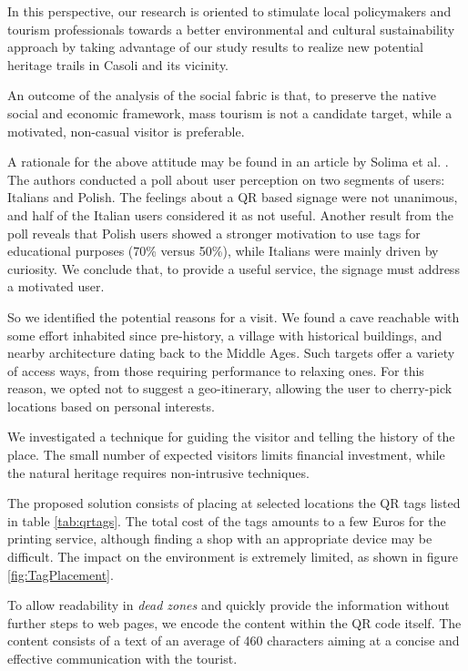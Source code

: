 \documentclass[sustainability,article,submit,pdftex,moreauthors]{Definitions/mdpi}
\begin{document}
In this perspective, our research is oriented to stimulate local policymakers and tourism professionals towards a better environmental and cultural sustainability approach by taking advantage of our study results to realize new potential heritage trails in Casoli and its vicinity.

An outcome of the analysis of the social fabric is that, to preserve the native social and economic framework, mass tourism is not a candidate target, while a motivated, non-casual visitor is preferable.

A rationale for the above attitude may be found in an article by Solima et al. \cite{sol18a}. The authors conducted a poll about user perception on two segments of users: Italians and Polish. The feelings about a QR based signage were not unanimous, and half of the Italian users considered it as not useful. Another result from the poll reveals that Polish users showed a stronger motivation to use tags for educational purposes (70\% versus 50\%), while Italians were mainly driven by curiosity. We conclude that, to provide a useful service, the signage must address a motivated user.

So we identified the potential reasons for a visit. We found a cave reachable with some effort inhabited since pre-history, a village with historical buildings, and nearby architecture dating back to the Middle Ages. Such targets offer a variety of access ways, from those requiring performance to relaxing ones. For this reason, we opted not to suggest a geo-itinerary, allowing the user to cherry-pick locations based on personal interests.

We investigated a technique for guiding the visitor and telling the history of the place. The small number of expected visitors limits financial investment, while the natural heritage requires non-intrusive techniques.

The proposed solution consists of placing at selected locations the QR tags listed in table \ref{tab:qrtags}. The total cost of the tags amounts to a few Euros for the printing service, although finding a shop with an appropriate device may be difficult. The impact on the environment is extremely limited, as shown in figure \ref{fig:TagPlacement}.

To allow readability in {\em dead zones} and quickly provide the information without further steps to web pages, we encode the content within the QR code itself. The content consists of a text of an average of 460 characters aiming at a concise and effective communication with the tourist.
\end{document}

